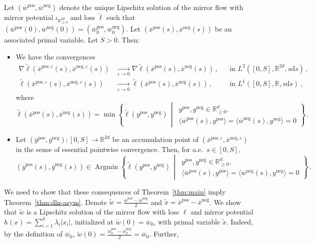 \documentclass[11pt,english,reqno]{article}
\DeclareMathOperator{\Argmin}{Argmin}
\newcommand{\diff}{\mathrm{d}}
\newcommand{\R}{\mathbb{R}}
\newcommand{\pos}{\text{pos}}
\renewcommand{\neg}{\text{neg}}
\renewcommand{\geq}{\geqslant}
\theoremstyle{plain}
\theoremstyle{definition}
\theoremstyle{remark}
\numberwithin{equation}{section}
\begin{document}
Let $(\overline{w}^\pos, \overline{w}^\neg)$ denote the unique Lipschitz solution of the mirror flow with mirror potential $\iota_{\R^{2d}_{\geq 0}}$ and loss $\widetilde{\ell}$ such that $(\overline{w}^\pos(0), \overline{w}^\neg(0)) = (\overline{w}_0^\pos, \overline{w}_0^\neg)$. Let $(\overline{x}^\pos(s), \overline{x}^\neg(s))$ be an associated primal variable. Let $S > 0$. Then:
\begin{itemize}
	\item[(b)] We have the convergences 
	\begin{align}
		\nabla \widetilde{\ell} \left(\overline{x}^{\pos,\varepsilon}(s), \overline{x}^{\neg,\varepsilon}(s)\right) &\xrightarrow[\varepsilon \to 0]{} \nabla \widetilde{\ell} \left(\overline{x}^{\pos}(s), \overline{x}^{\neg}(s)\right) \, , &&\text{in }L^2([0,S], \R^{2d}, s\diff s) \, , \label{eq:lifted-grad}\\
		\widetilde{\ell}\left(\overline{x}^{\pos,\varepsilon}(s), \overline{x}^{\neg,\varepsilon}(s)\right) &\xrightarrow[\varepsilon \to 0]{}  \widetilde{\ell} \left(\overline{x}^{\pos}(s), \overline{x}^{\neg}(s)\right) \, , &&\text{in }L^1([0,S], \R, s\diff s) \, , \label{eq:lifted-values}
	\end{align}
	where 
	\begin{equation*}
		\widetilde{\ell}(\overline{x}^\pos(s), \overline{x}^\neg(s)) = \min \left\{\widetilde{\ell}(y^\pos, y^\neg) \,\middle|\, \substack{y^\pos, y^\neg \in \R^d_{\geq 0} , \\ \langle \overline{w}^\pos(s), y^\pos \rangle = \langle \overline{w}^\neg(s), y^\neg \rangle = 0 }\right\} \, .
	\end{equation*}
	\item[(c)] Let $(\overline{y}^\pos,\overline{y}^\neg):[0,S]\to\R^{2d}$ be an accumulation point of $(\overline{x}^{\pos,\varepsilon},\overline{x}^{\neg,\varepsilon})$ in the sense of essential pointwise convergence. Then, for a.e.~$s \in [0,S]$,
	\begin{equation}
		\label{eq:lifted-acc}
		(\overline{y}^\pos(s), \overline{y}^\neg(s)) \in \Argmin \left\{\widetilde{\ell}(y^\pos, y^\neg) \,\middle|\, \substack{y^\pos, y^\neg \in \R^d_{\geq 0} , \\ \langle \overline{w}^\pos(s), y^\pos \rangle = \langle \overline{w}^\neg(s), y^\neg \rangle = 0 }\right\} \, .
	\end{equation}
\end{itemize}
We need to show that these consequences of Theorem~\ref{thm:main} imply Theorem~\ref{thm:dln-asym}. Denote $\widetilde{w} = \frac{\overline{w}^\pos - \overline{w}^\neg}{2}$ and $\widetilde{x} = \overline{x}^\pos - \overline{x}^\neg$. We show that $\widetilde{w}$ is a Lipschitz solution of the mirror flow with loss $\ell$ and mirror potential $h(x) = \sum_{i=1}^{d} \lambda_i \vert x_i \vert$, initialized at $\widetilde{w}(0) = \overline{w}_0$, with primal variable $\widetilde{x}$. Indeed, by the definition of $\overline{w}_0$, $\widetilde{w}(0) = \frac{\overline{w}_0^\pos - \overline{w}_0^\neg}{2} = \overline{w}_0$. Further,
\end{document}
